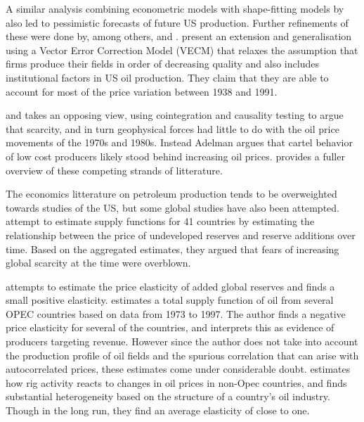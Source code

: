 \documentclass[12pt]{article}
\begin{document}
A similar analysis combining econometric models with shape-fitting models by \citet{cleveland_forecasting_1991} also led to pessimistic forecasts of future US production. Further refinements of these were done by, among others, \citet{pesaran_forecasting_1995}  and \citet{moroney_integrated_1999}. \citet{kaufmann_oil_2001} present an extension and generalisation using a Vector Error Correction Model (VECM) that relaxes the assumption that firms produce their fields in order of decreasing quality and also includes institutional factors in US oil production. They claim that they are able to account for most of the price variation between 1938 and 1991.

\citet{adelman_mineral_1990} and \citet{adelman_modelling_1993} takes an opposing view, using cointegration and causality testing to argue that scarcity, and in turn geophysical forces had little to do with the oil price movements of the 1970s and 1980s. Instead Adelman argues that cartel behavior of low cost producers likely stood behind increasing oil prices. \citet{lynch_forecasting_2002} provides a fuller overview of these competing strands of litterature. 

The economics litterature on petroleum production tends to be overweighted towards studies of the US, but some global studies have also been attempted. \citet{watkins_world_1998} attempt to estimate supply functions for 41 countries by estimating the relationship between the price of undeveloped reserves and reserve additions over time. Based on the aggregated estimates, they argued that fears of increasing global scarcity at the time were overblown. 

\citet{farzin_impact_2001} attempts to estimate the price elasticity of added global reserves and finds a small positive elasticity.  \citet{ramcharran_oil_2002} estimates a total supply function of oil from several OPEC countries based on data from 1973 to 1997.  The author finds a negative price elasticity for several of the countries, and interprets this as evidence of producers targeting revenue.  However since the author does not take into account the production profile of oil fields and the spurious correlation that can arise with autocorrelated prices, these estimates come under considerable doubt. \citet{ringlund_does_2008} estimates how rig activity reacts to changes in oil prices in non-Opec countries, and finds substantial heterogeneity based on the structure of a country's oil industry. Though in the long run, they find an average elasticity of close to one. 
\end{document}
